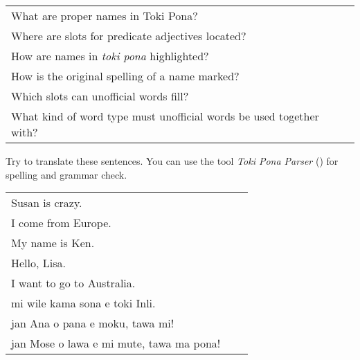 \begin{supertabular}{p{5,5cm}|ll}
What are proper names in Toki Pona? &&  \\ %
Where are slots for predicate adjectives located? &&  \\ %
How are names in \textit{toki pona} highlighted? &&  \\ %
How is the original spelling of a name marked? &&  \\ %
Which slots can unofficial words fill? &&  \\ %
What kind of word type must unofficial words be used together with? &&  \\ %
\end{supertabular}

Try to translate these sentences. 
You can use the tool \textit{Toki Pona Parser} (\cite{www:rowa:02}) for spelling and grammar check. 

\begin{supertabular}{p{5,5cm}|ll}
Susan is crazy.  &&   \\ %
I come from Europe. &&  \\ %
My name is Ken.  &&   \\ %
Hello, Lisa.  &&   \\ %
I want to go to Australia. &&   \\ %
mi wile kama sona e toki Inli.  &&   \\ %
jan Ana o pana e moku, tawa mi!  &&   \\ %
jan Mose o lawa e mi mute, tawa ma pona!  &&   \\ %
\end{supertabular} 

%
